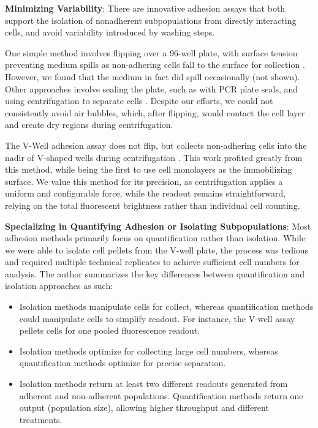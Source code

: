 \textbf{Minimizing Variability}:
There are innovative adhesion assays that both
support the isolation of nonadherent subpopulations from directly interacting
cells, and avoid variability introduced by washing steps.

One simple method involves flipping over a 96-well plate, with surface tension
preventing medium spills as non-adhering cells fall to the surface for
collection \cite{zepeda-morenoInnovativeMethodQuantification2011}. However, we
found that the medium in fact did spill occasionally (not shown). Other
approaches involve sealing the plate, such as with PCR plate seals, and using
centrifugation to separate cells \cite{reyesCentrifugationCellAdhesion2003,
    chenHighThroughputScreeningTest2021}. Despite our efforts, we could not
consistently avoid air bubbles, which, after flipping, would contact the cell
layer and create dry regions during centrifugation.

The V-Well adhesion assay does not flip, but collects non-adhering cells into
the nadir of V-shaped wells during centrifugation
\cite{weetallHomogeneousFluorometricAssay2001}. This work profited greatly from
this method, while  being the first to use cell
monolayers as the immobilizing surface. We value this method for its precision,
as centrifugation applies a uniform and configurable force, while the readout
remains straightforward, relying on the total fluorescent brightness rather than
individual cell counting.




\textbf{Specializing in Quantifying Adhesion or Isolating Subpopulations}: Most
adhesion methods primarily focus on quantification rather than isolation. While
we were able to isolate cell pellets from the V-well plate, the process was
tedious and required multiple technical replicates to achieve sufficient cell
numbers for analysis. The author summarizes the key differences between
quantification and isolation approaches as such:
\begin{itemize}
    \item Isolation methods manipulate cells for collect, whereas quantification
          methods could manipulate cells to simplify readout. For instance, the
          V-well assay pellets cells for one pooled fluorescence readout.
    \item Isolation methods optimize for collecting large cell numbers, whereas
          quantification methods optimize for precise separation.
    \item Isolation methods return at least two different readouts generated
          from adherent and non-adherent populations. Quantification methods
          return one output (population size), allowing higher throughput and
          different treatments.
\end{itemize}

